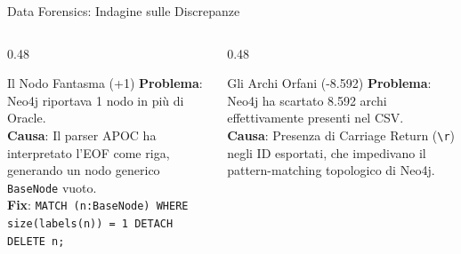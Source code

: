 \documentclass[aspectratio=169]{beamer}
\begin{document}
\begin{frame}{Data Forensics: Indagine sulle Discrepanze}
    \begin{columns}[T]
        \begin{column}{0.48\textwidth}
            \begin{block}{\faGhost \hspace{0.2cm} Il Nodo Fantasma (+1)}
                \small
                \textbf{Problema}: Neo4j riportava 1 nodo in più di Oracle.\\
                \textbf{Causa}: Il parser APOC ha interpretato l'EOF come riga, generando un nodo generico \texttt{BaseNode} vuoto.\\
                \textbf{Fix}: 
                \texttt{\tiny MATCH (n:BaseNode) WHERE size(labels(n)) = 1 DETACH DELETE n;}
            \end{block}
        \end{column}
        
        \begin{column}{0.48\textwidth}
            \begin{alertblock}{\faUnlink \hspace{0.2cm} Gli Archi Orfani (-8.592)}
                \small
                \textbf{Problema}: Neo4j ha scartato 8.592 archi effettivamente presenti nel CSV.\\
                \textbf{Causa}: Presenza di Carriage Return (\texttt{\textbackslash r}) negli ID esportati, che impedivano il pattern-matching topologico di Neo4j.
            \end{alertblock}
        \end{column}
    \end{columns}
\end{frame}
\end{document}
